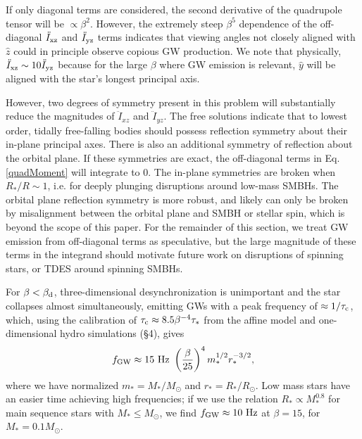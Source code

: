 \documentclass[useAMS, twocolumn, usenatbib]{mn2e}
\begin{document}
If only diagonal terms are considered, the second derivative of the quadrupole tensor will be $\propto \beta^2$.  However, the extremely steep $\beta^5$ dependence of the off-diagonal $\ddot{I}_{\rm xz}$ and $\ddot{I}_{\rm yz}$ terms indicates that viewing angles not closely aligned with $\hat{z}$ could in principle observe copious GW production.  We note that physically, $\ddot{I}_{\rm xz}\sim 10\ddot{I}_{\rm yz}$ because for the large $\beta$ where GW emission is relevant, $\hat{y}$ will be aligned with the star's longest principal axis.

However, two degrees of symmetry present in this problem will substantially reduce the magnitudes of $\ddot{I}_{xz}$ and $\ddot{I}_{yz}$.  The free solutions indicate that to lowest order, tidally free-falling bodies should possess reflection symmetry about their in-plane principal axes.  There is also an additional symmetry of reflection about the orbital plane.  If these symmetries are exact, the off-diagonal terms in Eq. \ref{quadMoment} will integrate to 0.  The in-plane symmetries are broken when $R_*/R\sim 1$, i.e. for deeply plunging disruptions around low-mass SMBHs.  The orbital plane reflection symmetry is more robust, and likely can only be broken by misalignment between the orbital plane and SMBH or stellar spin, which is beyond the scope of this paper.  For the remainder of this section, we treat GW emission from off-diagonal terms as speculative, but the large magnitude of these terms in the integrand should motivate future work on disruptions of spinning stars, or TDES around spinning SMBHs.

For $\beta < \beta_{\rm d}$, three-dimensional desynchronization is unimportant and the star collapses almost simultaneously, emitting GWs with a peak frequency of $\approx 1/\tau_{\rm c}$, which, using the calibration of $\tau_{\rm c}\approx 8.5\beta^{-4} \tau_*$ from the affine model and one-dimensional hydro simulations (\S 4), gives
\begin{equation}
f_{\rm GW}\approx 15~{\rm Hz}~ \left( \frac{\beta}{25}\right)^4 m_*^{1/2}r_*^{-3/2},
\end{equation}
where we have normalized $m_*=M_*/M_{\odot}$ and $r_*=R_*/R_{\odot}$.  Low mass stars have an easier time achieving high frequencies; if we use the relation $R_* \propto M_*^{0.8}$ for main sequence stars with $M_* \le M_{\odot}$, we find $f_{\rm GW}\approx 10~{\rm Hz}$ at $\beta=15$, for $M_*=0.1M_{\odot}$. 
\end{document}
